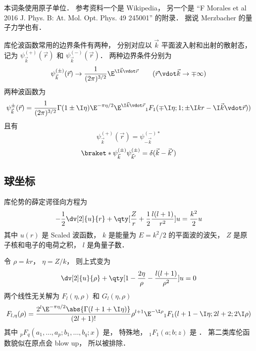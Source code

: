 
本词条使用原子单位． 参考资料一个是 Wikipedia， 另一个是 “F Morales et al 2016 J. Phys. B: At. Mol. Opt. Phys. 49 245001” 的附录． 据说 Merzbacher 的量子力学也有．

库伦波函数常用的边界条件有两种， 分别对应以 $\vec k$ 平面波入射和出射的散射态， 记为 $\psi_{\vec k}^{(+)}(\vec r)$ 和 $\psi_{\vec k}^{(-)}(\vec r)$． 两种边界条件分别为
\begin{equation}
\psi_{\vec k}^{(\pm)}(\vec r) \to \frac{1}{(2\pi)^{3/2}} \E^{\I\vec k\vdot\vec r}
\qquad
(\vec r\vdot \vec k \to \mp\infty)
\end{equation}
两种波函数为
\begin{equation}
\psi_{\vec k}^{\pm}(\vec r) = \frac{1}{(2\pi)^{3/2}} \Gamma(1\pm \I\eta)\E^{-\pi\eta/2} \E^{\I\vec k\vdot\vec r} {_1F_1}(\mp\I\eta; 1; \pm\I kr - \I \vec k\vdot \vec r))
\end{equation}
且有
\begin{equation}
\psi_{\vec k}^{(+)}(\vec r) = \psi_{-\vec k}^{(-)*}
\end{equation}
\begin{equation}
\braket*{\psi_{\vec k}^{(\pm)}}{\psi_{\vec k'}^{(\pm)}} = \delta(\vec k - \vec k')
\end{equation}

\subsection{球坐标}
库伦势的薛定谔径向方程为
\begin{equation}
-\frac12 \dv[2]{u}{r} + \qty[\frac{Z}{r} + \frac12 \frac{l(l+1)}{r^2}]u = \frac{k^2}{2}u
\end{equation}
其中 $u(r)$ 是 Scaled 波函数， $k$ 是能量为 $E = k^2/2$ 的平面波的波矢， $Z$ 是原子核和电子的电荷之积， $l$ 是角量子数．

令 $\rho = kr$， $\eta = Z/k$， 则上式变为
\begin{equation}
\dv[2]{u}{\rho} + \qty[1 - \frac{2\eta}{\rho} - \frac{l(l+1)}{\rho^2}]u = 0
\end{equation}
两个线性无关解为 $F_l(\eta, \rho)$ 和  $G_l(\eta, \rho)$
\begin{equation}
F_{l,\eta}(\rho) = \frac{2^l \E^{-\pi\eta/2} \abs{\Gamma(l+1+\I\eta)}}{(2l+1)!}
\rho^{l+1} \E^{-\I\rho} {_1F_1}(l+1-\I\eta; 2l+2; 2\I\rho)
\end{equation}
其中 $_p F_q(a_1,\dots,a_p; b_1,\dots,b_q; x)$ 是， 特殊地， $_1 F_1(a;b;z)$ 是 ． 第二类库伦函数貌似在原点会 blow up， 所以被排除．

